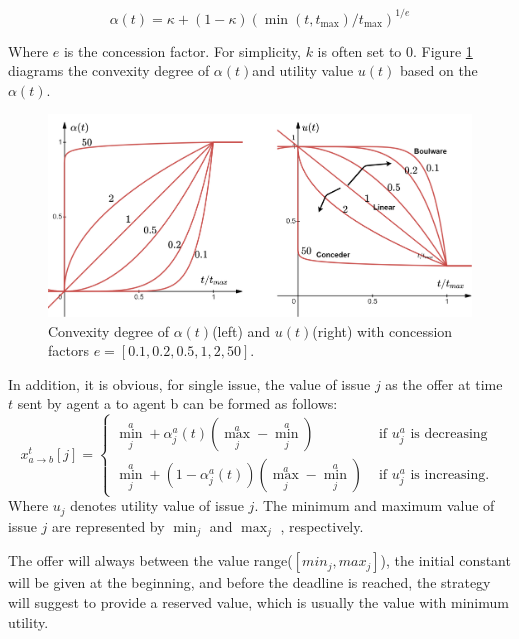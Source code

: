 \begin{equation}
\alpha(t)=\kappa+\left(1-\kappa\right)\left(\min \left(t, t_{\max }\right) / t_{\max }\right)^{1 / e}
\end{equation}

Where $e$ is the concession factor. For simplicity, $k$ is often set to $0$. Figure \ref{fig:boulware-conceder-combination} diagrams the convexity degree of $\alpha(t)$and utility value $u(t)$ based on the $\alpha(t)$.

\begin{figure}
\centering
\includegraphics[width=1.0\textwidth]{./images/conceder-boulware-combination.png}
\caption{Convexity degree of $\alpha(t)$(left) and $u(t)$(right) with concession factors $e=[0.1, 0.2, 0.5, 1, 2, 50]$.}
\label{fig:boulware-conceder-combination}
\end{figure}

In addition, it is obvious, for single issue, the value of issue $j$ as the offer at time $t$ sent by agent a to agent b can be formed as follows:
\begin{equation}
x_{a \rightarrow b}^{t}[j]=\left\{\begin{array}{ll}
\min _{j}^{a}+\alpha_{j}^{a}(t)\left(\max _{j}^{a}-\min _{j}^{a}\right) & \text { if } u_{j}^{a} \text { is decreasing } \\
\min _{j}^{a}+\left(1-\alpha_{j}^{a}(t)\right)\left(\max _{j}^{a}-\min _{j}^{a}\right) & \text { if } u_{j}^{a} \text { is increasing. }
\end{array}\right.
\end{equation}
Where $u_{j}$ denotes utility value of issue $j$. The minimum and maximum value of issue $j$ are represented by $\min _{j}$ and $\max _{j}$ , respectively.

The offer will always between the value range($[min_j, max_j]$), the initial constant will be given at the beginning, and before the deadline is reached, the strategy will suggest to provide a reserved value, which is usually the value with minimum utility.

